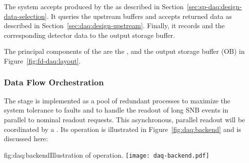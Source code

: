 The  system accepts  produced by the  as described
in Section~\ref{sec:sp-daq:design-data-selection}.  It queries the upstream  buffers and
accepts returned data as described in Section~\ref{sec:daq:design-upstream}. Finally, it records
 and the corresponding detector data to the output storage buffer.

The principal components of the  are the ,  and the output
storage buffer (OB) in Figure~\ref{fig:fd-daq:layout}.


\subsubsection{Data Flow Orchestration}

The  stage is implemented as a pool of redundant  processes to maximize the system tolerance to faults and to handle the readout of long SNB events in parallel to nominal readout requests. This asynchronous, parallel readout will be coordinated by a .  Its operation is illustrated in Figure~\ref{fig:daq:backend} and is discussed here:


\begin{dunefigure}{fig:daq:backend}{Illustration of   operation.}
  \texttt{[image: daq-backend.pdf]}
\end{dunefigure}

